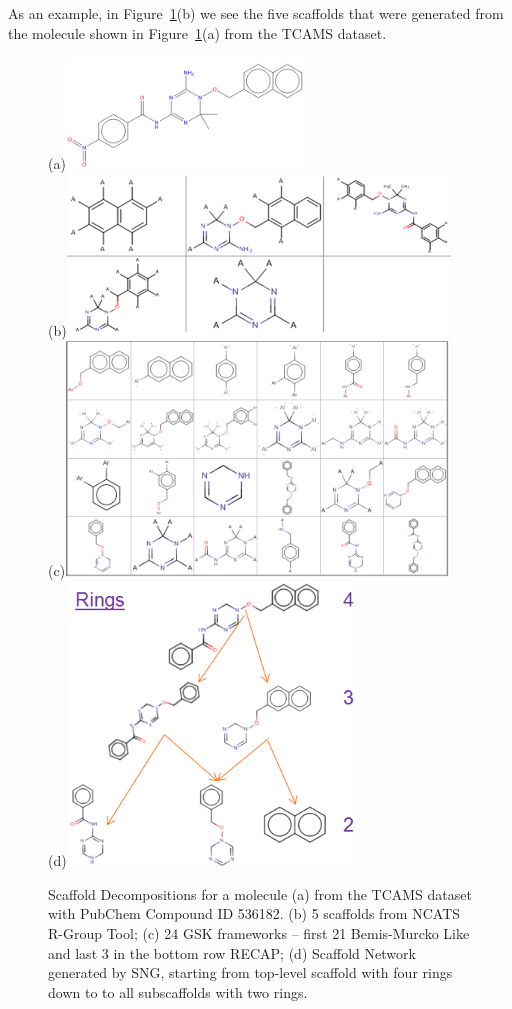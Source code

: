 \documentclass[journal=jacsat,manuscript=article]{achemso}
\newcommand*\fref[1]{Figure~\ref{fig:#1}}
\begin{document}
As an example, in \fref{scafmethod}(b) we see the five scaffolds that
were generated from the molecule shown in \fref{scafmethod}(a) from
the TCAMS dataset.

\begin{figure}
(a)\includegraphics[width=2.5in]{fig/tcam1_mol.png}\\
(b)\includegraphics[width=4in]{fig/tcam1_RGscaf.png}\\
(c)\includegraphics[width=4in]{fig/tcam1_GSKframes.png}\\
(d)\includegraphics[width=3in]{fig/tcam1_SNG3.png}
\caption{Scaffold Decompositions for a molecule (a) from the TCAMS dataset with PubChem Compound ID 536182. (b) 5 scaffolds from NCATS R-Group Tool; (c) 24 GSK frameworks -- first 21 Bemis-Murcko Like and last 3 in the bottom row RECAP; (d) Scaffold Network generated by SNG, starting from top-level scaffold with four rings down to to all subscaffolds with two rings.}
\label{fig:scafmethod}
\end{figure}
\end{document}
